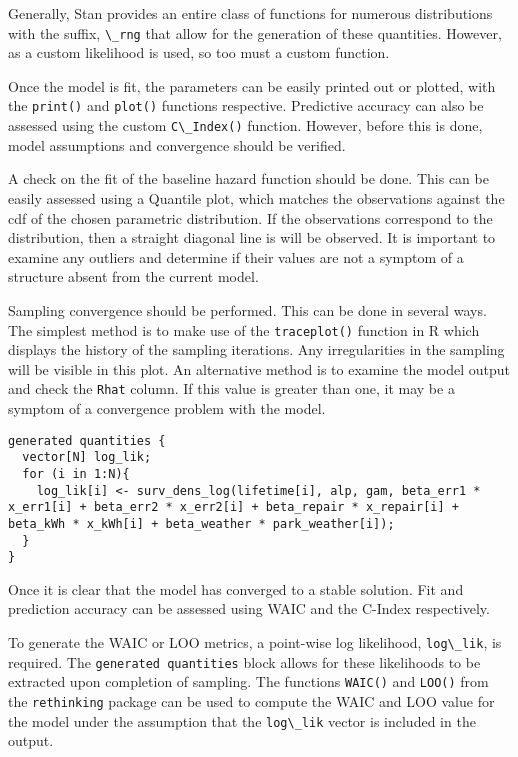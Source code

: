 Generally, Stan provides an entire class of functions for numerous distributions with the suffix, \lstinline{\_rng} that allow for the generation of these quantities. However, as a custom likelihood is used, so too must a custom function.

Once the model is fit, the parameters can be easily printed out or plotted, with the \lstinline{print()} and \lstinline{plot()} functions respective. Predictive accuracy can also be assessed using the custom \lstinline{C\_Index()} function. However, before this is done, model assumptions and convergence should be verified. 


A check on the fit of the baseline hazard function should be done. This can be easily assessed using a Quantile plot, which matches the observations against the cdf of the chosen parametric distribution. If the observations correspond to the distribution, then a straight diagonal line is will be observed. It is important to examine any outliers and determine if their values are not a symptom of a structure absent from the current model. 

Sampling convergence should be performed. This can be done in several ways. The simplest method is to make use of the \lstinline{traceplot()} function in R which displays the history of the sampling iterations. Any irregularities in the sampling will be visible in this plot. An alternative method is to examine the model output and check the \lstinline{Rhat} column. If this value is greater than one, it may be a symptom of a convergence problem with the model.

\begin{lstlisting}
generated quantities {
  vector[N] log_lik;
  for (i in 1:N){
  	log_lik[i] <- surv_dens_log(lifetime[i], alp, gam, beta_err1 * x_err1[i] + beta_err2 * x_err2[i] + beta_repair * x_repair[i] + beta_kWh * x_kWh[i] + beta_weather * park_weather[i]);
  }
}
\end{lstlisting}

Once it is clear that the model has converged to a stable solution. Fit and prediction accuracy can be assessed using WAIC and the C-Index respectively. 

To generate the WAIC or LOO metrics, a point-wise log likelihood, \lstinline{log\_lik}, is required. The \lstinline{generated quantities} block allows for these likelihoods to be extracted upon completion of sampling. The functions \lstinline{WAIC()} and \lstinline{LOO()} from the \lstinline{rethinking} package can be used to compute the WAIC and LOO value for the model under the assumption that the \lstinline{log\_lik} vector is included in the output. 

